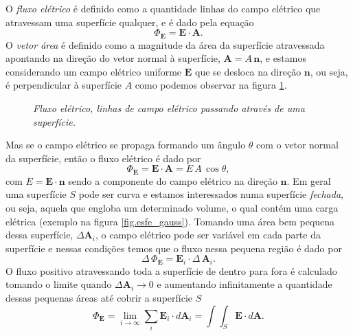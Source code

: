 O \textit{fluxo elétrico} é definido como a quantidade linhas do campo elétrico que atravessam uma superfície qualquer, e é dado pela equação
\begin{equation*}
\Phi_\textbf{E}=\textbf{E}\cdot\textbf{A}. 
\end{equation*} 
O \textit{vetor área} é definido como a magnitude da área da superfície atravessada apontando na direção do vetor normal à superfície, $\textbf{A}=A\,\textbf{n}$, e estamos considerando um campo elétrico uniforme $\textbf{E}$ que se desloca na direção $\textbf{n}$, ou seja, é perpendicular à superfície $A$ como podemos observar na figura \ref{fig.flux_ele}.
\begin{figure}[!htb]
\centering
{}
\quad
{}
\caption{\textit{Fluxo elétrico, linhas de campo elétrico passando através de uma superfície.}}
\label{fig.flux_ele}
\end{figure}
Mas se o campo elétrico se propaga formando um ângulo $\theta$ com o vetor normal da superfície, então o fluxo elétrico é dado por
\begin{equation*}
\Phi_\textbf{E}=\textbf{E}\cdot\textbf{A}=E\,A\,\cos\theta,
\end{equation*}
com $E=\textbf{E}\cdot\textbf{n}$ sendo a componente do campo elétrico na direção $\textbf{n}$. Em geral uma superfície $S$ pode ser curva e estamos interessados numa superfície \textit{fechada}, ou seja, aquela que engloba um determinado volume, o qual contém uma carga elétrica (exemplo na figura \ref{fig.esfe_gauss}). Tomando uma área bem pequena dessa superfície, $\Delta\textbf{A}_i$, o campo elétrico pode ser variável em cada parte da superfície e nessas condições temos que o fluxo nessa pequena região é dado por
\begin{equation*}
\Delta\,\Phi_\textbf{E}=\textbf{E}_i\cdot\Delta\,\textbf{A}_i.
\end{equation*}
O fluxo positivo atravessando toda a superfície de dentro para fora é calculado tomando o limite quando $\Delta\textbf{A}_i\to 0$ e aumentando infinitamente a quantidade dessas pequenas áreas até cobrir a superfície $S$
\begin{equation}\label{eq.fluxo_eletr}
\Phi_\textbf{E}=\lim_{i\to\infty}\sum_i\textbf{E}_i\cdot\textit{d}\textbf{A}_i=\int\int_S\textbf{E}\cdot\textit{d}\textbf{A}.
\end{equation}

